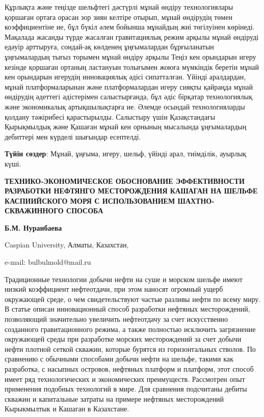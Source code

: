 Құрлықта және теңізде шельфтегі дәстүрлі мұнай өндіру технологиялары
қоршаған ортаға орасан зор зиян келтіре отырып, мұнай өндірудің төмен
коэффициентіне ие, бұл бүкіл әлем бойынша мұнайдың жиі төгілуінен
көрінеді. Мақалада жасанды түрде жасалған гравитациялық режим арқылы
мұнай өндіруді едәуір арттыруға, сондай-ақ көлденең ұңғымалардан
бұрғыланатын ұңғымалардың тығыз торымен мұнай өндіру арқылы Теңіз кен
орындарын игеру кезінде қоршаған ортаның ластануын толығымен жоюға
мүмкіндік беретін мұнай кен орындарын игерудің инновациялық әдісі
сипатталған. Үйінді аралдардан, мұнай платформаларынан және
платформалардан игеру сияқты қайраңда мұнай өндірудің әдеттегі
әдістерімен салыстырғанда, бұл әдіс бірқатар технологиялық және
экономикалық артықшылықтарға ие. Әлемде осындай технологияларды қолдану
тәжірибесі қарастырылды. Салыстыру үшін Қазақстандағы Қырықмылдық және
Қашаған мұнай кен орнының мысалында ұңғымалардың дебиттері мен күрделі
шығындар есептелді.

{\bfseries Түйін сөздер}: Мұнай, ұңғыма, игеру, шельф, үйінді арал,
тиімділік, ауырлық күші.

\begin{center}
{\large\bfseries ТЕХНИКО-ЭКОНОМИЧЕСКОЕ ОБОСНОВАНИЕ ЭФФЕКТИВНОСТИ РАЗРАБОТКИ
НЕФТЯНГО МЕСТОРОЖДЕНИЯ КАШАГАН НА ШЕЛЬФЕ КАСПИИЙСКОГО МОРЯ С
ИСПОЛЬЗОВАНИЕМ ШАХТНО-СКВАЖИННОГО СПОСОБА}

{\bfseries Б.М. Нуранбаева}

Caspian University, Алматы, Казахстан,

e-mail: bulbulmold@mail.ru
\end{center}

Традиционные технологии добычи нефти на суше и морском шельфе имеют
низкий коэффициент нефтеотдачи, при этом наносят огромный ущерб
окружающей среде, о чем свидетельствуют частые разливы нефти по всему
миру. В статье описан инновационный способ разработки нефтяных
месторождений, позволяющий значительно увеличить нефтеотдачу за счет
искусственно созданного гравитационного режима, а также полностью
исключить загрязнение окружающей среды при разработке морских
месторождений за счет добычи нефти плотной сеткой скважин, которые
бурятся из горизонтальных стволов. По сравнению с обычными способами
добычи нефти на шельфе, такими как разработка, с насыпных островов,
нефтяных платформ и платформ, этот способ имеет ряд технологических и
экономических преимуществ. Рассмотрен опыт применения подобных
технологий в мире. Для сравнения подсчитаны дебиты скважин и капитальные
затраты на примере нефтяных месторождений Кырыкмылтык и Кашаган в
Казахстане.

